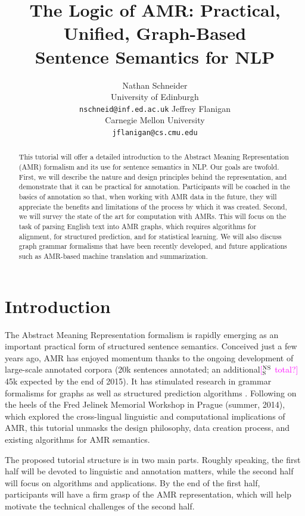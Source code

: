 \documentclass[11pt,letterpaper]{article}
\title{The Logic of AMR: Practical, Unified, Graph-Based\\ Sentence Semantics for NLP}
\author{Nathan Schneider\\
	University of Edinburgh\\
	{\tt nschneid@inf.ed.ac.uk}
\And
	Jeffrey Flanigan\\
	Carnegie Mellon University\\
	{\tt jflanigan@cs.cmu.edu}
	    }
\date{}
\newcommand{\ensuretext}[1]{#1}
\newcommand{\nssmarker}{\ensuretext{\textcolor{magenta}{\ensuremath{^{\textsc{NS}}_{\textsc{S}}}}}}
\newcommand{\arkcomment}[3]{\ensuretext{\textcolor{#3}{[#1 #2]}}}
\newcommand{\nss}[1]{\arkcomment{\nssmarker}{#1}{magenta}}
\begin{document}
\maketitle

\begin{abstract}
This tutorial will offer a detailed introduction to the Abstract Meaning Representation (AMR) formalism 
and its use for sentence semantics in NLP. Our goals are twofold. 
First, we will describe the nature and design principles behind the representation, 
and demonstrate that it can be practical for annotation. Participants will be coached in the basics of annotation 
so that, when working with AMR data in the future, they will appreciate the benefits and limitations 
of the process by which it was created. 
Second, we will survey the state of the art for computation with AMRs. 
This will focus on the task of parsing English text into AMR graphs, which 
requires algorithms for alignment, for structured prediction, and for statistical learning. 
We will also discuss graph grammar formalisms that have been recently developed, and future applications such as AMR-based machine translation and summarization.
\end{abstract}

\section{Introduction}

The Abstract Meaning Representation formalism \citep[AMR;][]{amr} 
is rapidly emerging as an important practical form of structured sentence semantics. 
Conceived just a few years ago, AMR has enjoyed momentum thanks to 
the ongoing development of large-scale annotated corpora 
(20k sentences annotated; an additional\nss{total?} 45k expected by the end of 2015).
It has stimulated research in grammar formalisms for graphs \citep{jones-12,chiang-13,braune-14}
as well as structured prediction algorithms \citep{flanigan-14}.
Following on the heels of the Fred Jelinek Memorial Workshop in Prague (summer, 2014), 
which explored the cross-lingual linguistic and computational implications of AMR, 
this tutorial unmasks the design philosophy, data creation process, and existing algorithms for 
AMR semantics.

The proposed tutorial structure is in two main parts. 
Roughly speaking, the first half will be devoted to linguistic and annotation matters, 
while the second half will focus on algorithms and applications.
By the end of the first half, participants will have a firm grasp of the AMR representation, 
which will help motivate the technical challenges of the second half.
\end{document}
